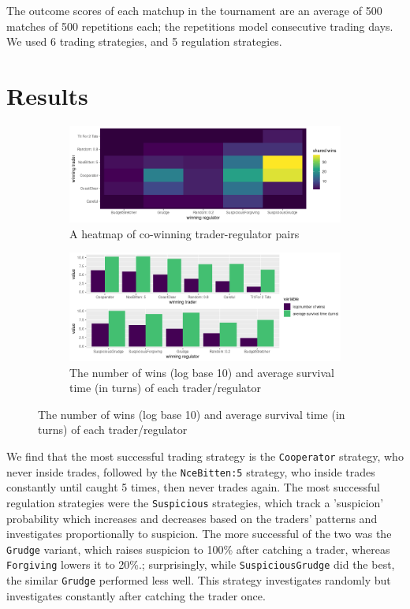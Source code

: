 \documentclass{article}
\begin{document}
The outcome scores of each matchup in the tournament are an average of 500 matches of 500 repetitions each; the repetitions model consecutive trading days. We used 6 trading strategies, and 5 regulation strategies.

\section{Results}
\begin{figure}[!h]
  \begin{subfigure}[c]{0.5\textwidth}
    \includegraphics[width=\textwidth]{heatmap.png}
    \caption{A heatmap of co-winning trader-regulator pairs}
    \label{fig:f1}
  \end{subfigure}
  \hfill
  \begin{subfigure}[c]{0.5\textwidth}
    \includegraphics[width=\textwidth]{barplot.png}
    \caption{The number of wins (log base 10) and average survival time (in turns) of each trader/regulator}
    \label{fig:f2}
  \end{subfigure}
\end{figure}

We find that the most successful trading strategy is the \texttt{Cooperator} strategy, who never inside trades, followed by the \texttt{NceBitten:5} strategy, who inside trades constantly until caught 5 times, then never trades again. The most successful regulation strategies were the \texttt{Suspicious} strategies, which track a 'suspicion' probability which increases and decreases based on the traders' patterns and investigates proportionally to suspicion. The more successful of the two was the \texttt{Grudge} variant, which raises suspicion to 100\% after catching a trader, whereas \texttt{Forgiving} lowers it to 20\%.; surprisingly, while \texttt{SuspiciousGrudge} did the best, the similar \texttt{Grudge} performed less well. This strategy investigates randomly but investigates constantly after catching the trader once.
\end{document}
